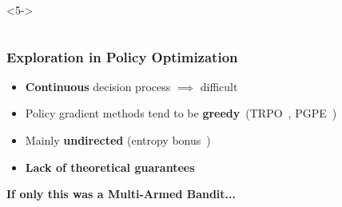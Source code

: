 \documentclass[aspectratio=169, table]{beamer}
\newcommand{\enb}[1]{\textcolor{poliblue1}{\textbf{#1}}}
\newcommand{\eno}[1]{\textcolor{orangep}{\textbf{#1}}}
\begin{document}
\begin{frame}
\begin{columns}
\begin{column}{.35\textwidth}
\begin{overlayarea}{\textwidth}{\textheight}
	<5->
\end{overlayarea}
\end{column}
\end{columns}
\end{frame}

\begin{frame} 
\frametitle{Exploration in Policy Optimization}
\begin{overlayarea}{\textwidth}{.75\textheight}
\begin{itemize}
	\setlength{\itemsep}{20pt}
	\item<1-4> \eno{Continuous} decision process $\implies$ difficult\vfill
	\item<2-4> Policy gradient methods tend to be \eno{greedy}~(\eg TRPO~\citep{schulman2015trust}, PGPE~\citep{sehnke2008policy})\vfill
	\item<3-4> Mainly \eno{undirected} (\eg entropy bonus~\citep{haarnoja2018soft})\vfill
	\item<4> \eno{Lack of theoretical guarantees}\vfill
\end{itemize}
\end{overlayarea}
\begin{overlayarea}{\textwidth}{.25\textheight}
\centering
\vspace{-40pt}
{\Large \enb{If only this was a Multi-Armed Bandit...}}
\end{overlayarea}
\end{frame}
\end{document}
